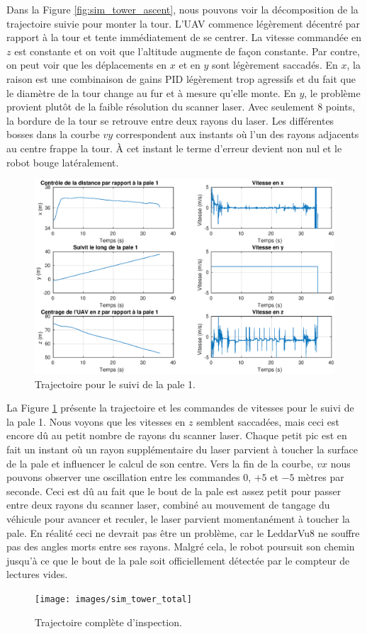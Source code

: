 Dans la Figure \ref{fig:sim_tower_ascent}, nous pouvons voir la décomposition de la trajectoire suivie pour monter la tour. L'UAV commence légèrement décentré par rapport à la tour et tente immédiatement de se centrer. La vitesse commandée en $z$ est constante et on voit que l'altitude augmente de façon constante. Par contre, on peut voir que les déplacements en $x$ et en $y$ sont légèrement saccadés. En $x$, la raison est une combinaison de gains PID légèrement trop agressifs et du fait que le diamètre de la tour change au fur et à mesure qu'elle monte. En $y$, le problème provient plutôt de la faible résolution du scanner laser. Avec seulement $8$ points, la bordure de la tour se retrouve entre deux rayons du laser. Les différentes bosses dans la courbe $vy$ correspondent aux instants où l'un des rayons adjacents au centre frappe la tour. À cet instant le terme d'erreur devient non nul et le robot bouge latéralement.
\begin{figure}[htb]
  \centering
  \includegraphics[trim=30 20 30 0, clip, width=\linewidth]{images/sim_suivit_pale}
  \caption{Trajectoire pour le suivi de la pale 1.}
  \label{fig:sim_suivit_pale}
\end{figure}

La Figure \ref{fig:sim_suivit_pale} présente la trajectoire et les commandes de vitesses pour le suivi de la pale 1. Nous voyons que les vitesses en $z$ semblent saccadées, mais ceci est encore dû au petit nombre de rayons du scanner laser. Chaque petit pic est en fait un instant où un rayon supplémentaire du laser parvient à toucher la surface de la pale et influencer le calcul de son centre. Vers la fin de la courbe, $vx$ nous pouvons observer une oscillation entre les commandes $0$, $+5$ et $-5$ mètres par seconde. Ceci est dû au fait que le bout de la pale est assez petit pour passer entre deux rayons du scanner laser, combiné au mouvement de tangage du véhicule pour avancer et reculer, le laser parvient momentanément à toucher la pale. En réalité ceci ne devrait pas être un problème, car le LeddarVu8 ne souffre pas des angles morts entre ses rayons. Malgré cela, le robot poursuit son chemin jusqu'à ce que le bout de la pale soit officiellement détectée par le compteur de lectures vides.
\begin{figure}[htb]
  \centering
  \texttt{[image: images/sim\_tower\_total]}
  \caption{Trajectoire complète d'inspection.}
  \label{fig:sim_tower_total}
\end{figure}

